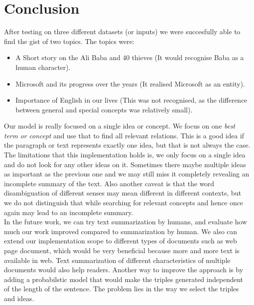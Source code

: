 \documentclass[conference]{IEEEtran}
\begin{document}
\section{Conclusion}
After testing on three different datasets (or inputs) we were succesfully able to find the gist of two topics. The topics were:
\begin{itemize}
\item A Short story on the Ali Baba and 40 thieves (It would recognise Baba as a human character).
\item Microsoft and its progress over the years (It realised Microsoft as an entity).
\item Importance of English in our lives (This was not recognised, as the difference between general and special concepts was relatively small).
\end{itemize}
Our model is really focused on a single idea or concept. We focus on one \textit{best term or concept} and use that to find all relevant relations. This is a good idea if the paragraph or text represents exactly one idea, but that is not always the case. The limitations that this implementation holds is, we only focus on a single idea and do not look for any other ideas on it. Sometimes there maybe multiple ideas as important as the previous one and we may still miss it completely revealing an incomplete summary of the text. Also another caveat is that the word disambiguation of different senses may mean different in different contexts, but we do not distinguish that while searching for relevant concepts and hence once again may lead to an incomplete summary.\\
In the future work, we can try text summarization by humans, and evaluate how much our work improved compared to summarization by human. We also can extend our implementation scope to different types of documents such as web page document, which would be very beneficial because more and more text is available in web. Text summarization of different characteristics of multiple documents would also help readers. Another way to improve the approach is by adding a probabilstic model that would make the triples generated independent of the length of the sentence. The problem lies in the way we select the triples and ideas.
\end{document}
